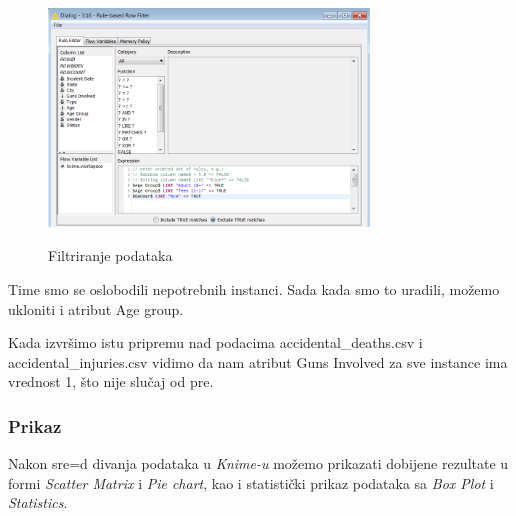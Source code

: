 \documentclass[12pt, a4paper]{article}
\def\dj{\leavevmode\setbox0=\hbox{d}\kern0pt
\rlap{\kern.215em\raise.46\ht0\hbox{-}}d}
\begin{document}
\begin{figure}[H]
\centering
\includegraphics[width=0.76\textwidth]{dataPrepare_ruleBasedRowFilter.png}
\label{fig:filter}
\caption{Filtriranje podataka}
\end{figure}

Time smo se oslobodili nepotrebnih instanci.
Sada kada smo to uradili, mo\v zemo ukloniti i atribut Age group.\break

Kada izvr\v simo istu pripremu nad podacima accidental\_deaths.csv i accidental\_injuries.csv vidimo da nam atribut Guns Involved za sve
instance ima vrednost 1, \v sto nije slu\v caj od pre.


\subsubsection{Prikaz}
Nakon sre\dj ivanja podataka u \textit{Knime-u} mo\v zemo prikazati dobijene rezultate u formi \textit{Scatter Matrix} i \textit{Pie chart}, kao i statisti\v cki prikaz podataka sa \textit{Box Plot} i \textit{Statistics}.
\end{document}
